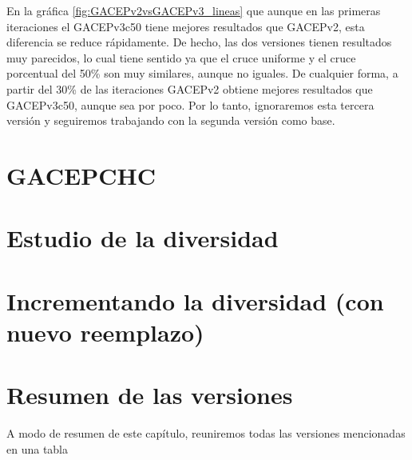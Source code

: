 En la gráfica \ref{fig:GACEPv2vsGACEPv3_lineas} que aunque en las primeras iteraciones el GACEPv3c50 tiene mejores resultados que GACEPv2, esta diferencia se reduce rápidamente. 
De hecho, las dos versiones tienen resultados muy parecidos, lo cual tiene sentido ya que el cruce uniforme y el cruce porcentual del 50\% son muy similares, aunque no iguales. 
De cualquier forma, a partir del 30\% de las iteraciones GACEPv2 obtiene mejores resultados que GACEPv3c50, aunque sea por poco. 
Por lo tanto, ignoraremos esta tercera versión y seguiremos trabajando con la segunda versión como base. 

\section{GACEPCHC}



\section{Estudio de la diversidad}



\section{Incrementando la diversidad (con nuevo reemplazo)}

\section{Resumen de las versiones}

A modo de resumen de este capítulo, reuniremos todas las versiones mencionadas en una tabla